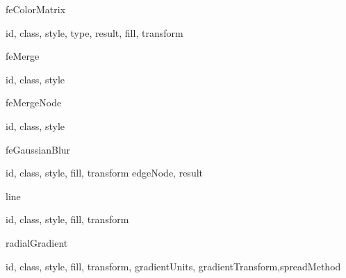 \documentclass{article}
\begin{document}
\begin{Element}{feColorMatrix}
    \begin{Required}
    \end{Required}
    \begin{Optional}
        id, class, style, type, result, fill, transform
    \end{Optional}
\end{Element}

\begin{Element}{feMerge}
    \begin{Optional}
        id, class, style
    \end{Optional}
\end{Element}

\begin{Element}{feMergeNode}
    \begin{Required}
    \end{Required}
    \begin{Optional}
        id, class, style
    \end{Optional}
\end{Element}

\begin{Element}{feGaussianBlur}
    \begin{Required}
    \end{Required}
    \begin{Optional}
        id, class, style, fill, transform edgeNode, result
    \end{Optional}
\end{Element}

\begin{Element}{line}
    \begin{Required}
    \end{Required}
    \begin{Optional}
        id, class, style, fill, transform
    \end{Optional}
\end{Element}

\begin{Element}{radialGradient}
    \begin{Required}
    \end{Required}
    \begin{Optional}
        id, class, style, fill, transform, gradientUnits, gradientTransform,spreadMethod
    \end{Optional}
\end{Element}
\end{document}
